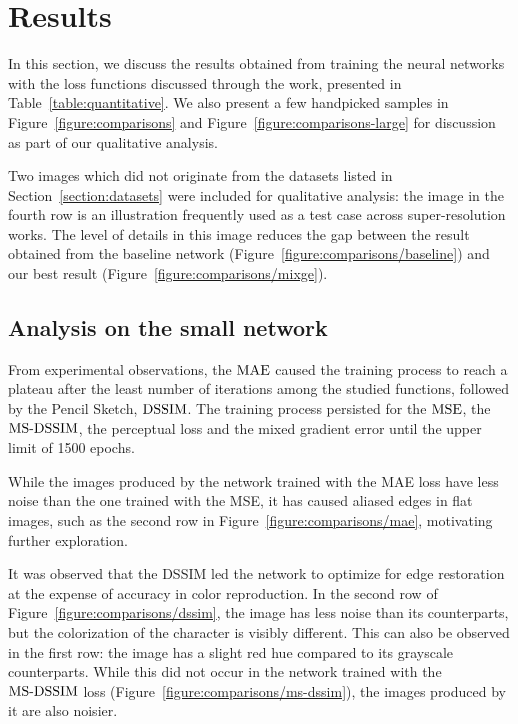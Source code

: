 \section{Results}





In this section, we discuss the results obtained from training the neural networks with the loss functions discussed through the work, presented in Table~\ref{table:quantitative}. We also present a few handpicked samples in Figure~\ref{figure:comparisons} and Figure~\ref{figure:comparisons-large} for discussion as part of our qualitative analysis. 

Two images which did not originate from the datasets listed in Section~\ref{section:datasets} were included for qualitative analysis: the image in the fourth row is an illustration frequently used as a test case across super-resolution works. The level of details in this image reduces the gap between the result obtained from the baseline network (Figure~\ref{figure:comparisons/baseline}) and our best result (Figure~\ref{figure:comparisons/mixge}). 

\subsection{Analysis on the small network}

From experimental observations, the $\operatorname{MAE}$ caused the training process to reach a plateau after the least number of iterations among the studied functions, followed by the Pencil Sketch, $\operatorname{DSSIM}$. The training process persisted for the $\operatorname{MSE}$, the $\operatorname{MS-DSSIM}$, the perceptual loss and the mixed gradient error until the upper limit of 1500 epochs.

While the images produced by the network trained with the MAE loss have less noise than the one trained with the MSE, it has caused aliased edges in flat images, such as the second row in Figure~\ref{figure:comparisons/mae}, motivating further exploration.

It was observed that the DSSIM led the network to optimize for edge restoration at the expense of accuracy in color reproduction.
In the second row of Figure~\ref{figure:comparisons/dssim}, the image has less noise than its counterparts, but the colorization of the character is visibly different.
This can also be observed in the first row: the image has a slight red hue compared to its grayscale counterparts.
While this did not occur in the network trained with the $\operatorname{MS-DSSIM}$ loss (Figure~\ref{figure:comparisons/ms-dssim}), the images produced by it are also noisier.

